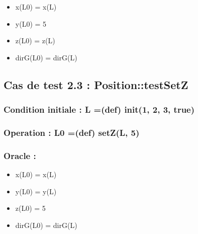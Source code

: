 \documentclass[11pt]{article}
\begin{document}
\begin{itemize}

\item x(L0) = x(L)\\
\label{sec-1.3.3.1}


\item y(L0) = 5\\
\label{sec-1.3.3.2}


\item z(L0) = z(L)\\
\label{sec-1.3.3.3}


\item dirG(L0) = dirG(L)\\
\label{sec-1.3.3.4}


\end{itemize} %
\subsection{Cas de test 2.3 : Position::testSetZ}
\label{sec-1.4}

\subsubsection{Condition initiale : L =(def) init(1, 2, 3, true)}
\label{sec-1.4.1}

\subsubsection{Operation : L0 =(def) setZ(L, 5)}
\label{sec-1.4.2}

\subsubsection{Oracle :}
\label{sec-1.4.3}

\begin{itemize}

\item x(L0) = x(L)\\
\label{sec-1.4.3.1}


\item y(L0) = y(L)\\
\label{sec-1.4.3.2}


\item z(L0) = 5\\
\label{sec-1.4.3.3}


\item dirG(L0) = dirG(L)\\
\label{sec-1.4.3.4}


\end{itemize} %
\end{document}
